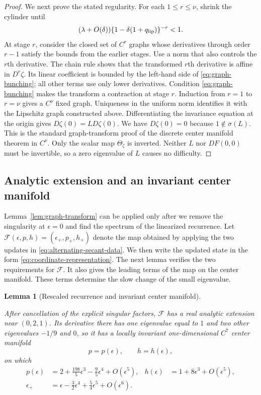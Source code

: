 \documentclass[11pt]{article}
\newtheorem{lemma}[theorem]{Lemma}
\begin{document}
\begin{proof}
We next prove the stated regularity.  For each
$1\le r\le\nu$, shrink the cylinder until
\begin{equation}\label{eq:graph-bunching}
(\lambda+O(\delta))
\{1-\delta(1+q_{\rm lip})\}^{-r}<1.
\end{equation}
At stage $r$, consider the closed set of $C^r$ graphs whose derivatives through
order $r-1$ satisfy the bounds from the earlier stages.  Use a norm that also
controls the $r$th derivative.  The chain rule shows that the transformed
$r$th derivative is affine in $D^r\zeta$.  Its linear coefficient is bounded
by the left-hand side of \eqref{eq:graph-bunching}; all other terms use only
lower derivatives.  Condition \eqref{eq:graph-bunching} makes the transform a
contraction at stage $r$.  Induction from $r=1$ to $r=\nu$ gives a $C^\nu$
fixed graph.  Uniqueness in the uniform norm identifies it with the Lipschitz
graph constructed above.  Differentiating the invariance equation at the
origin gives $D\zeta(0)=L D\zeta(0)$.  We have $D\zeta(0)=0$ because
$1\notin\sigma(L)$.  This is the standard graph-transform proof of the
discrete center manifold theorem in $C^\nu$.  Only the scalar map
$\Theta_\zeta$ is inverted.  Neither $L$ nor $DF(0,0)$ must be invertible, so
a zero eigenvalue of $L$ causes no difficulty.
\end{proof}

\subsection{Analytic extension and an invariant center manifold}

Lemma~\ref{lem:graph-transform} can be applied only after we remove the
singularity at $\epsilon=0$ and find the spectrum of the linearized recurrence.
Let
$\mathcal F(\epsilon,p,h)=(\epsilon_+,p_+,h_+)$ denote the map obtained by
applying the two updates in \eqref{eq:alternating-secant-data}.  We then write
the updated state in the form \eqref{eq:coordinate-representation}.  The next
lemma verifies the two requirements for $\mathcal F$.  It also gives the
leading terms of the map on the center manifold.  These terms determine the
slow change of the small eigenvalue.

\begin{lemma}[Rescaled recurrence and invariant center manifold]
\label{lem:center-manifold}





After cancellation of the explicit singular factors, $\mathcal F$ has a real
analytic extension near $(0,2,1)$.  Its derivative there has one eigenvalue
equal to $1$ and two other eigenvalues
$-1/9$ and $0$, so it has a
locally invariant one-dimensional $C^7$ center manifold
\[
p=p(\epsilon),\qquad h=h(\epsilon),
\]
on which
\begin{align}
p(\epsilon)&=2+\frac{198}{5}\epsilon^3
-\frac95\epsilon^4+O(\epsilon^5),
&h(\epsilon)&=1+8\epsilon^3+O(\epsilon^5),
\label{eq:center-curve}\\
\epsilon_+&=\epsilon-\frac32\epsilon^4
+\frac54\epsilon^5+O(\epsilon^6).
\label{eq:epsilon-map}
\end{align}
\end{lemma}
\end{document}
